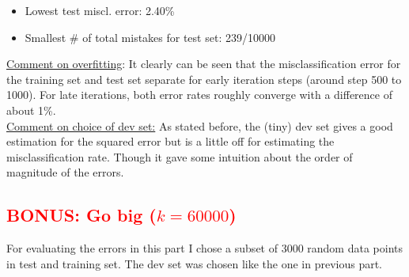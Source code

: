 \documentclass[12pt]{article}
\begin{document}
\begin{enumerate}
\begin{itemize}
		\item Lowest test miscl. error: 2.40\%
		\item Smallest \# of total mistakes for test set: 239/10000
	\end{itemize}
	\underline{Comment on overfitting}: It clearly can be seen that the misclassification error for the training set and test set separate for early iteration steps (around step 500 to 1000). For late iterations, both error rates roughly converge with a difference of about 1\%. \\
	\noindent
	\underline{Comment on choice of dev set:} As stated before, the (tiny) dev set gives a good estimation for the squared error but is a little off for estimating the misclassification rate. Though it gave some intuition about the order of magnitude of the errors.
\end{enumerate}

\subsection{\textcolor{red}{BONUS: Go big ($k=60000$)}}

For evaluating the errors in this part I chose a subset of 3000 random data points in test and training set. The dev set was chosen like the one in previous part.
\end{document}
